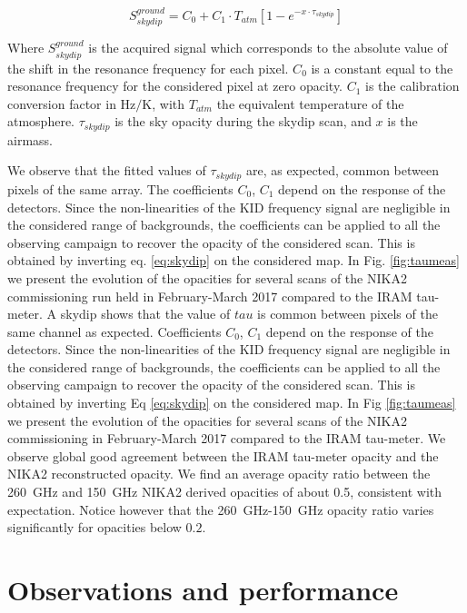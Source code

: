\documentclass[]{aa} %
\begin{document}
\begin{equation}\label{eq:skydip}
S^{ground}_{skydip} = C_0 + C_1 \cdot T_{atm}[1 - e^{- x \cdot \tau_{skydip}}]
\end{equation}

Where $S^{ground}_{skydip}$ is the acquired signal which corresponds to the
absolute value of the shift in the resonance frequency for each pixel. $C_0$ is
a constant equal to the resonance frequency for the considered pixel at zero
opacity. $C_1$ is the calibration conversion factor in $\mathrm{Hz/K}$, with
$T_{atm}$ the equivalent temperature of the atmosphere. $\tau_{skydip}$ is the
sky opacity during the skydip scan, and $x$ is the airmass.

We observe that the fitted values of $\tau_{skydip}$ are, as expected, common
between pixels of the same array. The coefficients $C_0$, $C_1$ depend on the
response of the detectors. Since the non-linearities of the KID frequency signal
are negligible in the considered range of backgrounds, the coefficients can be
applied to all the observing campaign to recover the opacity of the considered
scan. This is obtained by inverting eq. \ref{eq:skydip} on the considered
map. In Fig. \ref{fig:taumeas} we present the evolution of the opacities for
several scans of the NIKA2 commissioning run held in February-March 2017
compared to the IRAM tau-meter.  A skydip shows that the value of $tau$ is
common between pixels of the same channel as expected. Coefficients $C_0$, $C_1$
depend on the response of the detectors. Since the non-linearities of the KID
frequency signal are negligible in the considered range of backgrounds, the
coefficients can be applied to all the observing campaign to recover the opacity
of the considered scan. This is obtained by inverting Eq \ref{eq:skydip} on the
considered map. In Fig \ref{fig:taumeas} we present the evolution of the
opacities for several scans of the NIKA2 commissioning in February-March 2017
compared to the IRAM tau-meter. We observe global good agreement between the
IRAM tau-meter opacity and the NIKA2 reconstructed opacity. We find an average
opacity ratio between the 260~GHz and 150~GHz NIKA2 derived opacities of about
0.5, consistent with expectation. Notice however that the 260~GHz-150~GHz
opacity ratio varies significantly for opacities below $0.2$.


\section{Observations and performance}
\label{Observations and performance}
\end{document}
